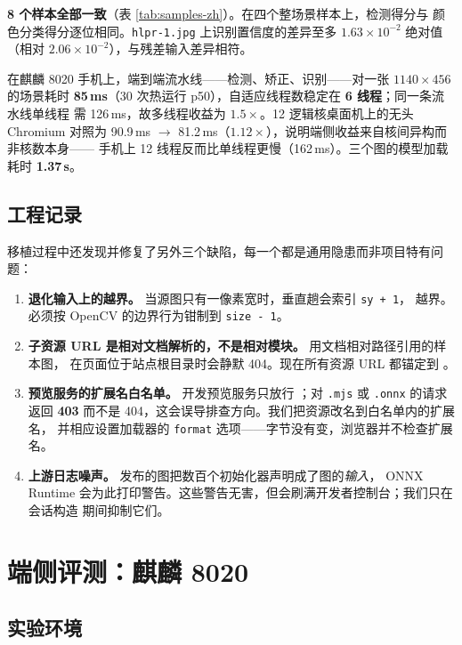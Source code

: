 \documentclass[UTF8,a4paper,11pt]{ctexart}
\begin{document}
\textbf{8 个样本全部一致}（表 \ref{tab:samples-zh}）。在四个整场景样本上，检测得分与
颜色分类得分逐位相同。\texttt{hlpr-1.jpg} 上识别置信度的差异至多 $1.63\times10^{-2}$
绝对值（相对 $2.06\times10^{-2}$），与残差输入差异相符。

在麒麟 8020 手机上，端到端流水线——检测、矫正、识别——对一张 $1140\times456$ 的场景耗时
\textbf{85\,ms}（30 次热运行 p50），自适应线程数稳定在 \textbf{6 线程}；同一条流水线单线程
需 126\,ms，故多线程收益为 $\mathbf{1.5\times}$。12 逻辑核桌面机上的无头 Chromium 对照为
90.9\,ms $\rightarrow$ 81.2\,ms（$1.12\times$），说明端侧收益来自核间异构而非核数本身——
手机上 12 线程反而比单线程更慢（162\,ms）。三个图的模型加载耗时 \textbf{1.37\,s}。

\subsection{工程记录}
移植过程中还发现并修复了另外三个缺陷，每一个都是通用隐患而非项目特有问题：

\begin{enumerate}
\item \textbf{退化输入上的越界。} 当源图只有一像素宽时，垂直趟会索引 \texttt{sy + 1}，
越界。必须按 OpenCV 的边界行为钳制到 \texttt{size - 1}。
\item \textbf{子资源 URL 是相对文档解析的，不是相对模块。} 用文档相对路径引用的样本图，
在页面位于站点根目录时会静默 404。现在所有资源 URL 都锚定到 。
\item \textbf{预览服务的扩展名白名单。} 开发预览服务只放行
；对 \texttt{.mjs} 或 \texttt{.onnx} 的请求
返回 \textbf{403} 而不是 404，这会误导排查方向。我们把资源改名到白名单内的扩展名，
并相应设置加载器的 \texttt{format} 选项——字节没有变，浏览器并不检查扩展名。
\item \textbf{上游日志噪声。} 发布的图把数百个初始化器声明成了图的\emph{输入}，
ONNX Runtime 会为此打印警告。这些警告无害，但会刷满开发者控制台；我们只在会话构造
期间抑制它们。
\end{enumerate}

\section{端侧评测：麒麟 8020}
\label{sec:kirin}

\subsection{实验环境}
\end{document}
